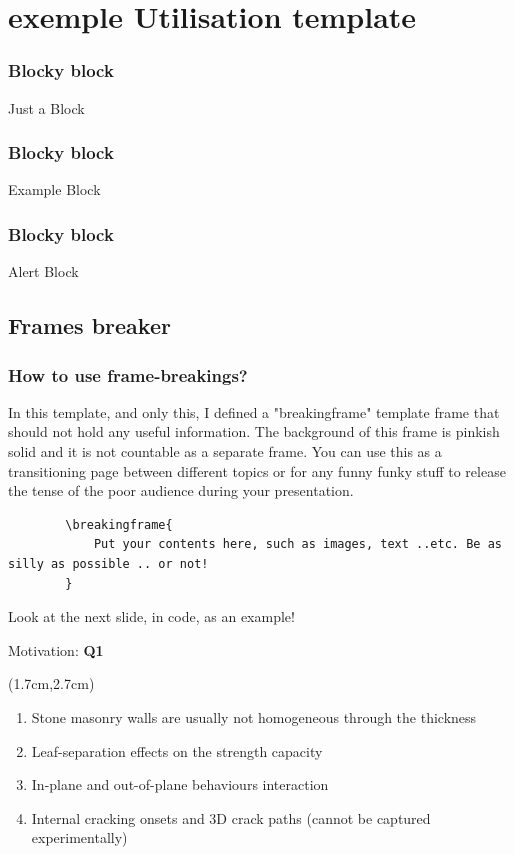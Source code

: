 \documentclass{presentation_template}
\begin{document}
\section{exemple Utilisation template}

\begin{frame}
\frametitle{Blocky block}
\begin{block}{Just a Block}
\lipsum[1]
\end{block}
\end{frame}

\begin{frame}
\frametitle{Blocky block}
\begin{exampleblock}{Example Block}
\lipsum[1]
\end{exampleblock}
\end{frame}

\begin{frame}
\frametitle{Blocky block}
\begin{alertblock}{Alert Block}
\lipsum[1]
\end{alertblock}
\end{frame}

\subsection{Frames breaker}
\begin{frame}[fragile]
\frametitle{How to use frame-breakings?}
    In this template, and only this, I defined a "breakingframe" template frame that should not hold any useful information. The background of this frame is pinkish solid and it is not countable as a separate frame. You can use this as a transitioning page between different topics or for any funny funky stuff to release the tense of the poor audience during your presentation.
    \vspace{10pt}
    \begin{lstlisting}
        \breakingframe{
            Put your contents here, such as images, text ..etc. Be as silly as possible .. or not!
        }
    \end{lstlisting}
    \vspace{10pt}
    Look at the next slide, in code, as an example!
\end{frame}

\begin{frame}[t]{Motivation: \textcolor{myviolet}{{\textbf{Q1}}}}\vspace{10pt}
    \begin{textblock*}{13cm}(1.7cm,2.7cm)
    \begin{enumerate}[<+->]
    \setlength\itemsep{10pt}
        \item Stone masonry walls are usually not homogeneous through the thickness
        \item Leaf-separation effects on the strength capacity
        \item In-plane and out-of-plane behaviours interaction
        \item Internal cracking onsets and 3D crack paths (cannot be captured experimentally)
    \end{enumerate}
    \end{textblock*}
\end{frame}
\end{document}
